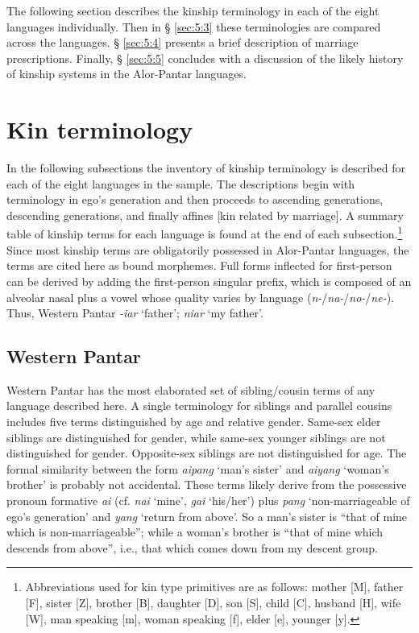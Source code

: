 The following section describes the kinship terminology in each of the eight languages individually. Then in {\S} \ref{sec:5:3} these terminologies are compared across the languages. {\S} \ref{sec:5:4} presents a brief description of marriage prescriptions. Finally, {\S} \ref{sec:5:5} concludes with a discussion of the likely history of kinship systems in the Alor-Pantar languages. 


\section{Kin terminology}\label{sec:5:2}
In the following subsections the inventory of kinship terminology is described for each of the eight languages in the sample. The descriptions begin with terminology in ego's generation and then proceeds to ascending generations, descending generations, and finally affines [kin related by marriage]. A summary table of kinship terms for each language is found at the end of each subsection.\footnote{{ }  Abbreviations used for kin type primitives are as follows: mother [M], father [F], sister [Z], brother [B], daughter [D], son [S], child [C], husband [H], wife [W], man speaking [m], woman speaking [f], elder [e], younger [y].}   Since most kinship terms are obligatorily possessed in Alor-Pantar languages, the terms are cited here as bound morphemes. Full forms inflected for first-person can be derived by adding the first-person singular prefix, which is composed of an alveolar nasal plus a vowel whose quality varies by language (\textit{n-}/\textit{na-}/\textit{no-}/\textit{ne-}). Thus, Western Pantar \textit{-iar} `father'; \textit{niar} `my father'.

\subsection{Western Pantar}\label{sect_wp}
Western Pantar has the most elaborated set of sibling/cousin terms of any language described here. A single terminology for siblings and parallel cousins includes five terms distinguished by age and relative gender. Same-sex elder siblings are distinguished for gender, while same-sex younger siblings are not distinguished for gender. Opposite-sex siblings are not distinguished for age. The formal similarity between the form \textit{aipang} `man's sister' and \textit{aiyang} `woman's brother' is probably not accidental. These terms likely derive from the possessive pronoun formative \textit{ai} (cf. \textit{nai} `mine', \textit{gai} `his/her') plus \textit{pang} `non-marriageable of ego's generation' and \textit{yang} `return from above'. So a man's sister is ``that of mine which is non-marriageable''; while a woman's brother is ``that of mine which descends from above'', i.e., that which comes down from my descent group. 

